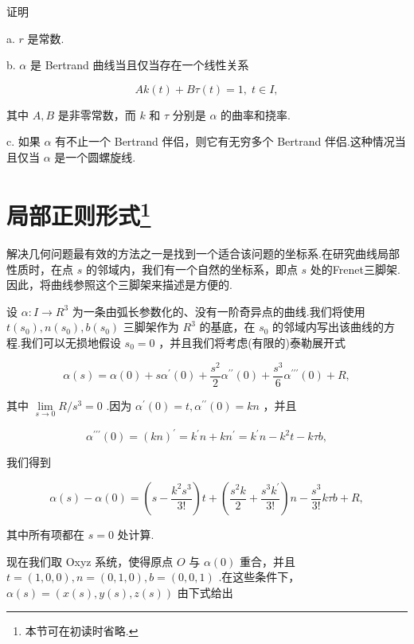 证明

a. \(r\) 是常数.

b. \(\alpha\) 是 Bertrand 曲线当且仅当存在一个线性关系

\[
{Ak}\left( t\right)  + {B\tau }\left( t\right)  = 1,\;t \in  I,
\]

其中 \(A,B\) 是非零常数，而 \(k\) 和 \(\tau\) 分别是 \(\alpha\) 的曲率和挠率.

c. 如果 \(\alpha\) 有不止一个 Bertrand 伴侣，则它有无穷多个 Bertrand 伴侣.这种情况当且仅当 \(\alpha\) 是一个圆螺旋线.

\section{局部正则形式\footnote{本节可在初读时省略.}}

解决几何问题最有效的方法之一是找到一个适合该问题的坐标系.在研究曲线局部性质时，在点 \(s\) 的邻域内，我们有一个自然的坐标系，即点 \(s\) 处的Frenet三脚架.因此，将曲线参照这个三脚架来描述是方便的.

设 \(\alpha  : I \rightarrow  {R}^{3}\) 为一条由弧长参数化的、没有一阶奇异点的曲线.我们将使用 \(t\left( {s}_{0}\right) ,n\left( {s}_{0}\right) ,b\left( {s}_{0}\right)\) 三脚架作为 \({R}^{3}\) 的基底，在 \({s}_{0}\) 的邻域内写出该曲线的方程.我们可以无损地假设 \({s}_{0} = 0\) ，并且我们将考虑(有限的)泰勒展开式

\[
\alpha \left( s\right)  = \alpha \left( 0\right)  + s{\alpha }^{\prime }\left( 0\right)  + \frac{{s}^{2}}{2}{\alpha }^{\prime \prime }\left( 0\right)  + \frac{{s}^{3}}{6}{\alpha }^{\prime \prime \prime }\left( 0\right)  + R,
\]

其中 \(\mathop{\lim }\limits_{{s \rightarrow  0}}R/{s}^{3} = 0\) .因为 \({\alpha }^{\prime }\left( 0\right)  = t,{\alpha }^{\prime \prime }\left( 0\right)  = {kn}\) ，并且

\[
{\alpha }^{\prime \prime \prime }\left( 0\right)  = {\left( kn\right) }^{\prime } = {k}^{\prime }n + k{n}^{\prime } = {k}^{\prime }n - {k}^{2}t - {k\tau b},
\]

我们得到

\[
\alpha \left( s\right)  - \alpha \left( 0\right)  = \left( {s - \frac{{k}^{2}{s}^{3}}{3!}}\right) t + \left( {\frac{{s}^{2}k}{2} + \frac{{s}^{3}{k}^{\prime }}{3!}}\right) n - \frac{{s}^{3}}{3!}{k\tau b} + R,
\]

其中所有项都在 \(s = 0\) 处计算.

现在我们取 Oxyz 系统，使得原点 \(O\) 与 \(\alpha \left( 0\right)\) 重合，并且 \(t = \left( {1,0,0}\right) ,n = \left( {0,1,0}\right) ,b = \left( {0,0,1}\right)\) .在这些条件下， \(\alpha \left( s\right)  = \left( {x\left( s\right) ,y\left( s\right) ,z\left( s\right) }\right)\) 由下式给出

